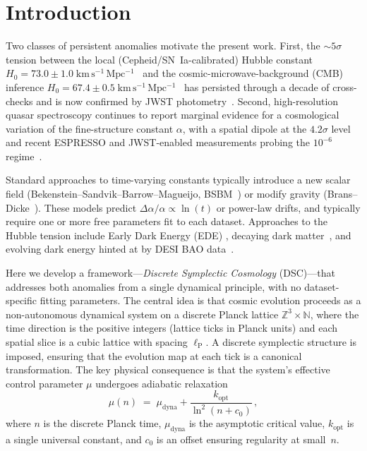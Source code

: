 \documentclass[twocolumn,showpacs,preprintnumbers,amsmath,amssymb,prd]{revtex4-2}
\newcommand{\lnq}{\ln^2}
\newcommand{\lP}{\ell_{\mathrm{P}}}
\newcommand{\ZZ}{\mathbb{Z}}
\newcommand{\NN}{\mathbb{N}}
\begin{document}
\section{Introduction}\label{sec:intro}

Two classes of persistent anomalies motivate the present work.
First, the $\sim\!5\sigma$ tension between the local
(Cepheid/SN~Ia-calibrated) Hubble constant
$H_0 = 73.0 \pm 1.0\;\mathrm{km\,s^{-1}\,Mpc^{-1}}$~\cite{Riess2022}
and the cosmic-microwave-background (CMB) inference
$H_0 = 67.4 \pm 0.5\;\mathrm{km\,s^{-1}\,Mpc^{-1}}$~\cite{Planck2020}
has persisted through a decade of cross-checks and is now confirmed by
JWST photometry~\cite{Riess2024}.
Second, high-resolution quasar spectroscopy continues to report
marginal evidence for a cosmological variation of the fine-structure
constant $\alpha$, with a spatial dipole at the
$4.2\sigma$ level~\cite{Webb2011,King2012} and recent ESPRESSO and
JWST-enabled measurements probing the $10^{-6}$ regime~\cite{Murphy2024}.

Standard approaches to time-varying constants typically introduce a
new scalar field
(Bekenstein--Sandvik--Barrow--Magueijo, BSBM~\cite{Bekenstein1982,
Sandvik2002}) or modify gravity (Brans--Dicke~\cite{BransDicke1961}).
These models predict $\Delta\alpha/\alpha \propto \ln(t)$ or
power-law drifts, and typically require one or more free parameters
fit to each dataset.
Approaches to the Hubble tension include Early Dark Energy (EDE)
\cite{Poulin2019}, decaying dark matter~\cite{Vattis2019},
and evolving dark energy hinted at by DESI BAO
data~\cite{DESI2024}.

Here we develop a framework---\textit{Discrete Symplectic Cosmology}
(DSC)---that addresses both anomalies from a single dynamical
principle, with no dataset-specific fitting parameters.
The central idea is that cosmic evolution proceeds as a
non-autonomous dynamical system on a discrete Planck lattice
$\ZZ^3 \times \NN$, where the time direction is the positive
integers (lattice ticks in Planck units) and each spatial slice is a
cubic lattice with spacing $\lP$.
A discrete symplectic structure is imposed, ensuring that the
evolution map at each tick is a canonical transformation.
The key physical consequence is that the system's effective control
parameter $\mu$ undergoes adiabatic relaxation
\begin{equation}
  \mu(n) \;=\; \mu_{\mathrm{dyna}} + \frac{k_{\mathrm{opt}}}{\lnq(n+c_0)}\,,
  \label{eq:cooling}
\end{equation}
where $n$ is the discrete Planck time, $\mu_{\mathrm{dyna}}$ is the
asymptotic critical value, $k_{\mathrm{opt}}$ is a single universal
constant, and $c_0$ is an offset ensuring regularity at small~$n$.
\end{document}
